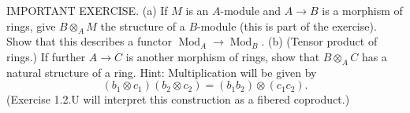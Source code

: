 IMPORTANT EXERCISE. (a) If $M$ is an $A$-module and $A\to B$ is a morphism of rings, give $B\otimes_A M$ the structure of a $B$-module (this is part of the exercise). Show that this describes a functor $\operatorname{Mod}_A\to\operatorname{Mod}_B$. (b) (Tensor product of rings.) If further $A\to C$ is another morphism of rings, show that $B\otimes_A C$ has a natural structure of a ring. Hint: Multiplication will be given by
$$
(b_1\otimes c_1)(b_2\otimes c_2)=(b_1b_2)\otimes(c_1c_2).
$$
(Exercise 1.2.U will interpret this construction as a fibered coproduct.)
